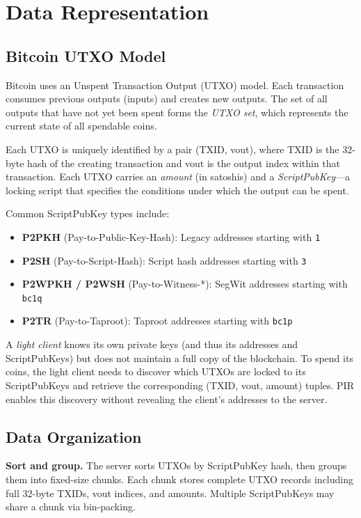 \section{Data Representation}
\label{sec:data}

\subsection{Bitcoin UTXO Model}

Bitcoin uses an Unspent Transaction Output (UTXO) model. Each transaction consumes previous outputs (inputs) and creates new outputs. The set of all outputs that have not yet been spent forms the \emph{UTXO set}, which represents the current state of all spendable coins.

Each UTXO is uniquely identified by a pair (TXID, vout), where TXID is the 32-byte hash of the creating transaction and vout is the output index within that transaction. Each UTXO carries an \emph{amount} (in satoshis) and a \emph{ScriptPubKey}---a locking script that specifies the conditions under which the output can be spent.

Common ScriptPubKey types include:
\begin{itemize}[nolistsep,leftmargin=*]
    \item \textbf{P2PKH} (Pay-to-Public-Key-Hash): Legacy addresses starting with \texttt{1}
    \item \textbf{P2SH} (Pay-to-Script-Hash): Script hash addresses starting with \texttt{3}
    \item \textbf{P2WPKH / P2WSH} (Pay-to-Witness-*): SegWit addresses starting with \texttt{bc1q}
    \item \textbf{P2TR} (Pay-to-Taproot): Taproot addresses starting with \texttt{bc1p}
\end{itemize}

A \emph{light client} knows its own private keys (and thus its addresses and ScriptPubKeys) but does not maintain a full copy of the blockchain. To spend its coins, the light client needs to discover which UTXOs are locked to its ScriptPubKeys and retrieve the corresponding (TXID, vout, amount) tuples. PIR enables this discovery without revealing the client's addresses to the server.

\subsection{Data Organization}

\textbf{Sort and group.} The server sorts UTXOs by ScriptPubKey hash, then groups them into fixed-size chunks. Each chunk stores complete UTXO records including full 32-byte TXIDs, vout indices, and amounts. Multiple ScriptPubKeys may share a chunk via bin-packing.

